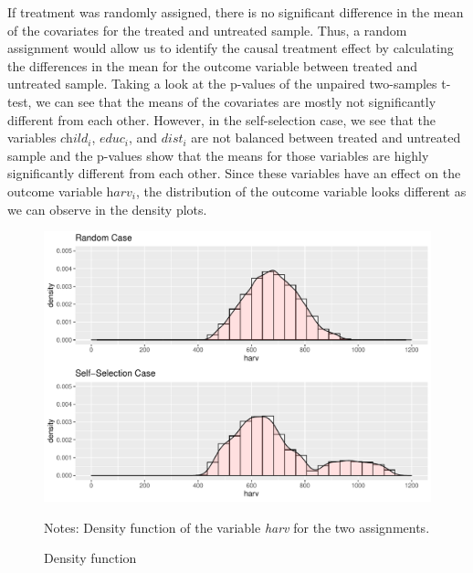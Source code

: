 \begin{enumerate}
If treatment was randomly assigned, there is no significant difference in the mean of the covariates for the treated and untreated sample. Thus, a random assignment would allow us to identify the causal treatment effect by calculating the differences in the mean for the outcome variable between treated and untreated sample. Taking a look at the p-values of the  unpaired two-samples t-test, we can see that the means of the covariates are mostly not significantly different from each other. However, in the self-selection case, we see that the variables $\textit{child}_i$, $\textit{educ}_i$, and $\textit{dist}_i$ are not balanced between treated and untreated sample and the p-values show that the means for those variables are highly significantly different from each other. Since these variables have an effect on the outcome variable $\textit{harv}_i$, the distribution of the outcome variable looks different as we can observe in the density plots.

\begin{figure}[htb]
\begin{raggedleft}
\includegraphics[width=\linewidth]{../figures/density_total.pdf}
\caption{Density function}
\label{fig:density}
\footnotesize{Notes: Density function of the variable \textit{harv} for the two assignments.}
\end{raggedleft}
\end{figure}


\end{enumerate}
